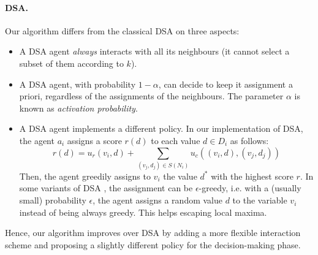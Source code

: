 \paragraph{DSA.} Our algorithm differs from the classical DSA on three aspects:
\begin{itemize}
    \item A DSA agent \emph{always} interacts with all its neighbours (it cannot select a subset of them according to $k$).
    \item A DSA agent, with probability $1-\alpha$, can decide to keep it assignment a priori, regardless of the assignments of the neighbours. The parameter $\alpha$ is known as \emph{activation probability}.
    \item A DSA agent implements a different policy. In our implementation of DSA, the agent $a_i$ assigns a score $r(d)$ to each value $d \in D_i$ as follows:
    $$
    r(d) = u_r(v_i, d) + \sum_{(v_j, d_j) \in S(N_i)} u_c \left((v_i, d),  (v_j, d_j)\right)
    $$
    Then, the agent greedily assigns to $v_i$ the value $d^*$ with the highest score $r$. In some variants of DSA \cite{Zhang_Wang_Xing_Wittenburg_2005}, the assignment can be $\epsilon$-greedy, i.e. with a (usually small) probability $\epsilon$, the agent assigns a random value $d$ to the variable $v_i$ instead of being always greedy. This helps escaping local maxima.
\end{itemize}
Hence, our algorithm improves over DSA by adding a more flexible interaction scheme and proposing a slightly different policy for the decision-making phase. 
